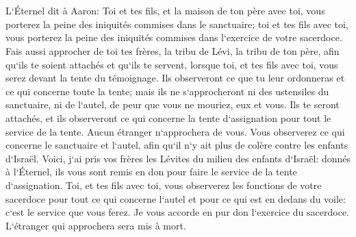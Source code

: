 \chapter{}

\verse L`Éternel dit à Aaron: Toi et tes fils, et la maison de ton père avec toi, vous porterez la peine des iniquités commises dans le sanctuaire; toi et tes fils avec toi, vous porterez la peine des iniquités commises dans l`exercice de votre sacerdoce. 
\verse Fais aussi approcher de toi tes frères, la tribu de Lévi, la tribu de ton père, afin qu`ils te soient attachés et qu`ils te servent, lorsque toi, et tes fils avec toi, vous serez devant la tente du témoignage. 
\verse Ils observeront ce que tu leur ordonneras et ce qui concerne toute la tente; mais ils ne s`approcheront ni des ustensiles du sanctuaire, ni de l`autel, de peur que vous ne mouriez, eux et vous. 
\verse Ils te seront attachés, et ils observeront ce qui concerne la tente d`assignation pour tout le service de la tente. Aucun étranger n`approchera de vous. 
\verse Vous observerez ce qui concerne le sanctuaire et l`autel, afin qu`il n`y ait plus de colère contre les enfants d`Israël. 
\verse Voici, j`ai pris vos frères les Lévites du milieu des enfants d`Israël: donnés à l`Éternel, ils vous sont remis en don pour faire le service de la tente d`assignation. 
\verse Toi, et tes fils avec toi, vous observerez les fonctions de votre sacerdoce pour tout ce qui concerne l`autel et pour ce qui est en dedans du voile: c`est le service que vous ferez. Je vous accorde en pur don l`exercice du sacerdoce. L`étranger qui approchera sera mis à mort. 
